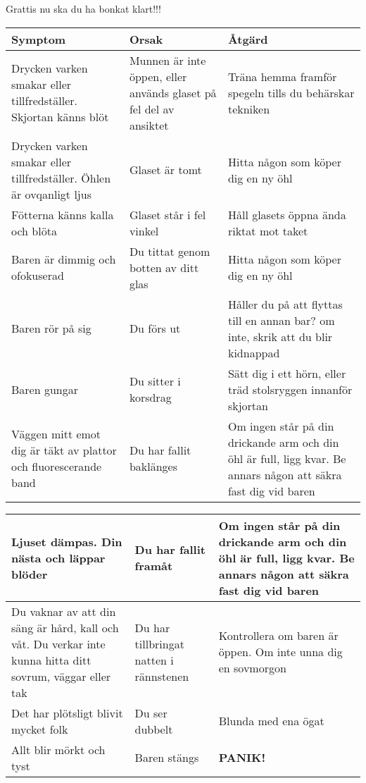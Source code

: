 Grattis nu ska du ha bonkat klart!!!\newpage


\begin{tabularx}{0.9\textwidth}{ 
  | >{\centering\arraybackslash}X 
  | >{\centering\arraybackslash}X 
  | >{\centering\arraybackslash}X | }
    \hline
    \textbf{Symptom} & \textbf{Orsak} & \textbf{Åtgärd} \\
    \hline
    Drycken varken smakar eller tillfredställer. Skjortan känns blöt & 
    Munnen är inte öppen, eller används glaset på fel del av ansiktet & 
    Träna hemma framför spegeln tills du behärskar tekniken \\
    \hline
    Drycken varken smakar eller tillfredställer. Öhlen är ovqanligt ljus &
    Glaset är tomt &
    Hitta någon som köper dig en ny öhl \\
    \hline
    Fötterna känns kalla och blöta &
    Glaset står i fel vinkel &
    Håll glasets öppna ända riktat mot taket \\
    \hline
    Baren är dimmig och ofokuserad &
    Du tittat genom botten av ditt glas &
    Hitta någon som köper dig en ny öhl \\
    \hline
    Baren rör på sig &
    Du förs ut &
    Håller du på att flyttas till en annan bar? om inte, skrik att du blir kidnappad \\
    \hline
    Baren gungar &
    Du sitter i korsdrag &
    Sätt dig i ett hörn, eller träd stolsryggen innanför skjortan \\
    \hline
    Väggen mitt emot dig är täkt av plattor och fluorescerande band &
    Du har fallit baklänges &
    Om ingen står på din drickande arm och din öhl är full, ligg kvar. Be annars någon att säkra fast dig vid baren \\
    \hline
    
    
    
\end{tabularx}

\begin{tabularx}{0.9\textwidth}{ 
  | >{\centering\arraybackslash}X 
  | >{\centering\arraybackslash}X 
  | >{\centering\arraybackslash}X | }

    \hline
    Ljuset dämpas. Din nästa och läppar blöder&
    Du har fallit framåt &
    Om ingen står på din drickande arm och din öhl är full, ligg kvar. Be annars någon att säkra fast dig vid baren \\
    \hline
    Du vaknar av att din säng är hård, kall och våt. Du verkar inte kunna hitta ditt sovrum, väggar eller tak &
    Du har tillbringat natten i rännstenen &
    Kontrollera om baren är öppen. Om inte unna dig en sovmorgon\\
    \hline
    Det har plötsligt blivit mycket folk &
    Du ser dubbelt &
    Blunda med ena ögat \\
    \hline
    Allt blir mörkt och tyst &
    Baren stängs &
    \textbf{PANIK!} \\
    \hline

    \end{tabularx}

\newpage

\newpage